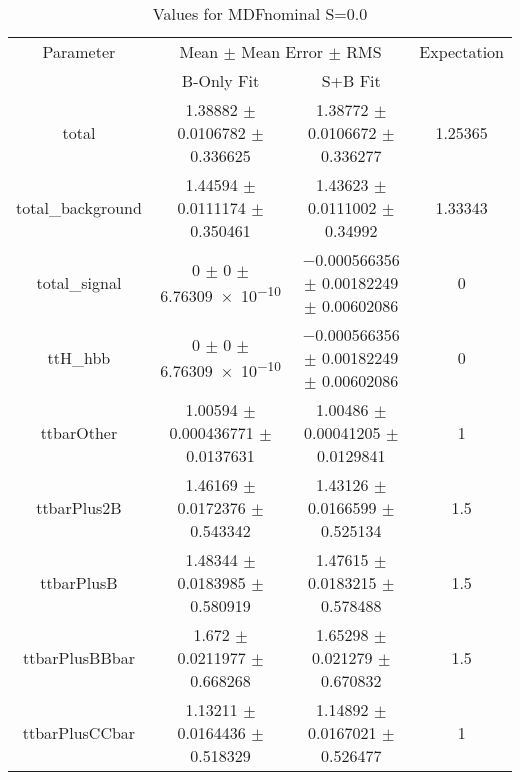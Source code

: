 \begin{table}
\centering
\caption{Values for MDFnominal S=0.0}
\begin{tabular}{cccc}
\toprule
Parameter & \multicolumn{2}{c}{Mean $\pm$ Mean Error $\pm$ RMS} & Expectation\\
 & B-Only Fit & S+B Fit & \\
\midrule
total & \num{1.38882} $\pm$ \num{0.0106782} $\pm$ \num{0.336625} & \num{1.38772} $\pm$ \num{0.0106672} $\pm$ \num{0.336277} & \num{1.25365}\\
total\_background & \num{1.44594} $\pm$ \num{0.0111174} $\pm$ \num{0.350461} & \num{1.43623} $\pm$ \num{0.0111002} $\pm$ \num{0.34992} & \num{1.33343}\\
total\_signal & \num{0} $\pm$ \num{0} $\pm$ \num{6.76309e-10} & \num{-0.000566356} $\pm$ \num{0.00182249} $\pm$ \num{0.00602086} & \num{0}\\
ttH\_hbb & \num{0} $\pm$ \num{0} $\pm$ \num{6.76309e-10} & \num{-0.000566356} $\pm$ \num{0.00182249} $\pm$ \num{0.00602086} & \num{0}\\
ttbarOther & \num{1.00594} $\pm$ \num{0.000436771} $\pm$ \num{0.0137631} & \num{1.00486} $\pm$ \num{0.00041205} $\pm$ \num{0.0129841} & \num{1}\\
ttbarPlus2B & \num{1.46169} $\pm$ \num{0.0172376} $\pm$ \num{0.543342} & \num{1.43126} $\pm$ \num{0.0166599} $\pm$ \num{0.525134} & \num{1.5}\\
ttbarPlusB & \num{1.48344} $\pm$ \num{0.0183985} $\pm$ \num{0.580919} & \num{1.47615} $\pm$ \num{0.0183215} $\pm$ \num{0.578488} & \num{1.5}\\
ttbarPlusBBbar & \num{1.672} $\pm$ \num{0.0211977} $\pm$ \num{0.668268} & \num{1.65298} $\pm$ \num{0.021279} $\pm$ \num{0.670832} & \num{1.5}\\
ttbarPlusCCbar & \num{1.13211} $\pm$ \num{0.0164436} $\pm$ \num{0.518329} & \num{1.14892} $\pm$ \num{0.0167021} $\pm$ \num{0.526477} & \num{1}\\
\bottomrule
\end{tabular}
\end{table}